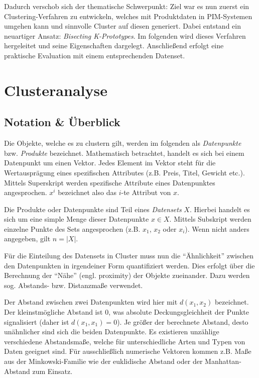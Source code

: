 Dadurch verschob sich der thematische Schwerpunkt: Ziel war es nun
zuerst ein Clustering-Verfahren zu entwickeln, welches mit Produktdaten
in PIM-Systemen umgehen kann und sinnvolle Cluster auf diesen generiert.
Dabei entstand ein neuartiger Ansatz: \emph{Bisecting K-Prototypes}. Im
folgenden wird dieses Verfahren hergeleitet und seine Eigenschaften
dargelegt. Anschließend erfolgt eine praktische Evaluation mit einem
entsprechenden Datenset.

\hypertarget{clusteranalyse}{%
\section{Clusteranalyse}\label{clusteranalyse}}

\hypertarget{notation-uxfcberblick}{%
\subsection{Notation \& Überblick}\label{notation-uxfcberblick}}

Die Objekte, welche es zu clustern gilt, werden im folgenden als
\emph{Datenpunkte} bzw. \emph{Produkte} bezeichnet. Mathematisch
betrachtet, handelt es sich bei einem Datenpunkt um einen Vektor. Jedes
Element im Vektor steht für die Wertausprägung eines spezifischen
Attributes (z.B. Preis, Titel, Gewicht etc.). Mittels Superskript werden
spezifische Attribute eines Datenpunktes angesprochen. \(x^i\)
bezeichnet also das \(i\)-te Attribut von \(x\).

Die Produkte oder Datenpunkte sind Teil eines \emph{Datensets} \(X\).
Hierbei handelt es sich um eine simple Menge dieser Datenpunkte
\(x \in X\). Mittels Subskript werden einzelne Punkte des Sets
angesprochen (z.B. \(x_1\), \(x_2\) oder \(x_i\)). Wenn nicht anders
angegeben, gilt \(n=|X|\).

Für die Einteilung des Datensets in Cluster muss nun die ``Ähnlichkeit''
zwischen den Datenpunkten in irgendeiner Form quantifiziert werden. Dies
erfolgt über die Berechnung der ``Nähe'' (engl. proximity) der Objekte
zueinander. Dazu werden sog. Abstands- bzw. Distanzmaße verwendet.
\autocite[Kap. 1.2 Types of Data and How to Handle Them]{kaufman2009}

Der Abstand zwischen zwei Datenpunkten wird hier mit \(d(x_1,x_2)\)
bezeichnet. Der kleinstmögliche Abstand ist \(0\), was absolute
Deckungsgleichheit der Punkte signalisiert (daher ist
\(d(x_1,x_1) = 0\)). Je größer der berechnete Abstand, desto unähnlicher
sind sich die beiden Datenpunkte. Es existieren unzählige verschiedene
Abstandsmaße, welche für unterschiedliche Arten und Typen von Daten
geeignet sind. Für ausschließlich numerische Vektoren kommen z.B. Maße
aus der Minkowski-Familie wie der euklidische Abstand oder der
Manhattan-Abstand zum Einsatz. \autocite[ Kap. 1.2 Types of Data and How
to Handle Them]{kaufman2009}

